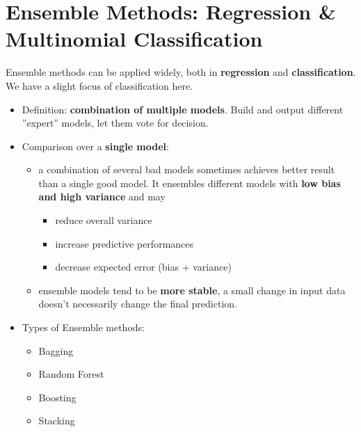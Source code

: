 \section{Ensemble Methods: Regression \& Multinomial Classification}
Ensemble methods can be applied widely, both in \textbf{regression} and \textbf{classification}. We have a slight focus of classification here.
\begin{itemize}
	\item Definition: \textbf{combination of multiple models}. Build and output different ''expert'' models, let them vote for decision. 
	\item Comparison over a \textbf{single model}: 
	\begin{itemize}
		\item a combination of several bad models sometimes achieves better result than a single good model. It ensembles different models with \textbf{low bias and high variance} and may
		\begin{itemize}
			\item reduce overall variance
			\item increase predictive performances
			\item decrease expected error (bias + variance)
		\end{itemize}
		\item ensemble models tend to be \textbf{more stable}, a small change in input data doesn't necessarily change the final prediction.
	\end{itemize}
	\item Types of Ensemble methods:
	\begin{itemize}
		\item Bagging
		\item Random Forest
		\item Boosting
		\item Stacking
	\end{itemize}  
\end{itemize}

